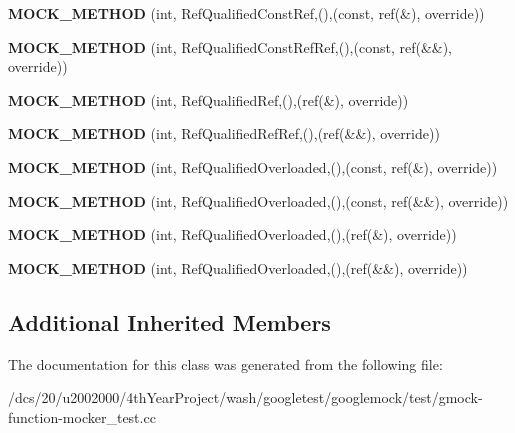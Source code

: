 \begin{DoxyCompactItemize}
\mbox{\label{classtesting_1_1gmock__function__mocker__test_1_1MockFoo_ac34611f80378de2609230f345328d02a}} 
{\bfseries M\+O\+C\+K\+\_\+\+M\+E\+T\+H\+OD} (int, Ref\+Qualified\+Const\+Ref,(),(const, ref(\&), override))
\item 
\mbox{\label{classtesting_1_1gmock__function__mocker__test_1_1MockFoo_a8c7fdef6410df4ea15921eb0c00388a5}} 
{\bfseries M\+O\+C\+K\+\_\+\+M\+E\+T\+H\+OD} (int, Ref\+Qualified\+Const\+Ref\+Ref,(),(const, ref(\&\&), override))
\item 
\mbox{\label{classtesting_1_1gmock__function__mocker__test_1_1MockFoo_a7a75db1ec6d3f305a431c1dc190c3d48}} 
{\bfseries M\+O\+C\+K\+\_\+\+M\+E\+T\+H\+OD} (int, Ref\+Qualified\+Ref,(),(ref(\&), override))
\item 
\mbox{\label{classtesting_1_1gmock__function__mocker__test_1_1MockFoo_a769fef0826a5ec89bdf0b7348f9c140b}} 
{\bfseries M\+O\+C\+K\+\_\+\+M\+E\+T\+H\+OD} (int, Ref\+Qualified\+Ref\+Ref,(),(ref(\&\&), override))
\item 
\mbox{\label{classtesting_1_1gmock__function__mocker__test_1_1MockFoo_a8e89bc16471d33aa0283e05a49968614}} 
{\bfseries M\+O\+C\+K\+\_\+\+M\+E\+T\+H\+OD} (int, Ref\+Qualified\+Overloaded,(),(const, ref(\&), override))
\item 
\mbox{\label{classtesting_1_1gmock__function__mocker__test_1_1MockFoo_ac2a0aa0e551730615ff592e0381ea410}} 
{\bfseries M\+O\+C\+K\+\_\+\+M\+E\+T\+H\+OD} (int, Ref\+Qualified\+Overloaded,(),(const, ref(\&\&), override))
\item 
\mbox{\label{classtesting_1_1gmock__function__mocker__test_1_1MockFoo_a6ce1d0cc10d3b052a3be6b4cc7bddffe}} 
{\bfseries M\+O\+C\+K\+\_\+\+M\+E\+T\+H\+OD} (int, Ref\+Qualified\+Overloaded,(),(ref(\&), override))
\item 
\mbox{\label{classtesting_1_1gmock__function__mocker__test_1_1MockFoo_a0a7f6d2cfc6bc1abc6a362e723fbf9b4}} 
{\bfseries M\+O\+C\+K\+\_\+\+M\+E\+T\+H\+OD} (int, Ref\+Qualified\+Overloaded,(),(ref(\&\&), override))
\end{DoxyCompactItemize}
\subsection*{Additional Inherited Members}


The documentation for this class was generated from the following file\+:\begin{DoxyCompactItemize}
\item 
/dcs/20/u2002000/4th\+Year\+Project/wash/googletest/googlemock/test/gmock-\/function-\/mocker\+\_\+test.\+cc\end{DoxyCompactItemize}
